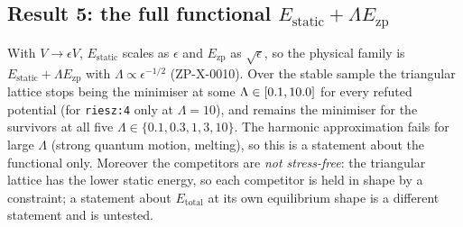 \documentclass[10pt]{article}
\newcommand{\Ezp}{E_{\mathrm{zp}}}
\begin{document}
\subsection{Result 5: the full functional \texorpdfstring{$E_{\mathrm{static}}+\Lambda\Ezp$}{E\_static + Lambda E\_zp}}
With $V\to\epsilon V$, $E_{\mathrm{static}}$ scales as $\epsilon$ and $\Ezp$ as $\sqrt\epsilon$, so the physical family is $E_{\mathrm{static}}+\Lambda\Ezp$ with $\Lambda\propto\epsilon^{-1/2}$ (ZP-X-0010). Over the stable sample the triangular lattice stops being the minimiser at some
$\Lambda\in[0.1,10.0]$ for every refuted potential (for \texttt{riesz:4} only at $\Lambda=10$), and remains the minimiser for the survivors at all five $\Lambda\in\{0.1,0.3,1,3,10\}$. The harmonic approximation fails for large $\Lambda$ (strong quantum motion, melting), so this
is a statement about the functional only. Moreover the competitors are \emph{not stress-free}: the triangular lattice has the lower static energy, so each competitor is held in shape by a constraint; a statement about $E_{\mathrm{total}}$ at its own equilibrium shape is a different statement and is untested.
\end{document}
